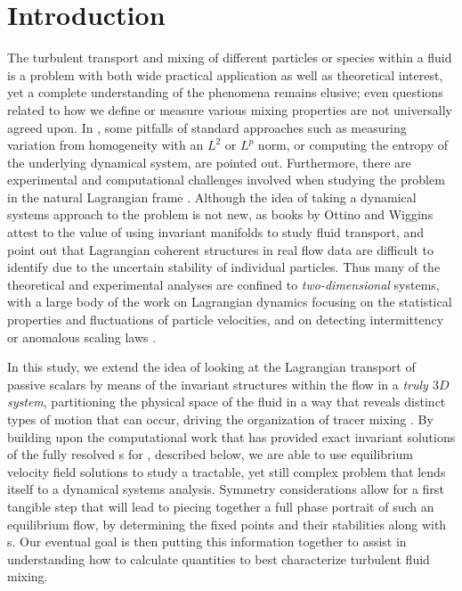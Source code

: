 

\section{Introduction}
\label{sec:intro}

The turbulent transport and mixing of different particles or species 
within a fluid is a problem with both wide practical application as well 
as theoretical interest, yet a complete understanding of the phenomena 
remains elusive; even questions related to how we define or measure 
various mixing properties are not universally agreed upon. In 
\cite{MaMPe05}, some pitfalls of standard approaches such as measuring 
variation from homogeneity with an $L^2$ or $L^p$ norm, or computing the 
entropy of the underlying dynamical system, are pointed out. Furthermore, 
there are experimental and computational challenges involved when 
studying the problem in the natural Lagrangian frame 
\cite{MHPRS07,ABBBBB08,BrLiEc06,MoLePi04}. Although the idea of taking a 
dynamical systems approach to the problem is not new, as books by Ottino 
\cite{Botti89} and Wiggins \cite{Wiggins1992} attest to the value of
using invariant manifolds to study fluid transport, \cite{MHPRS07} and 
\cite{Haller02} point out that Lagrangian coherent structures in 
real flow data are difficult to identify due to the uncertain stability 
of individual particles. Thus many of the theoretical and experimental 
analyses are confined to \textit{two-dimensional} systems, with a large 
body of the work on Lagrangian dynamics focusing on the statistical 
properties and fluctuations of particle velocities, and on detecting 
intermittency or anomalous scaling laws 
\cite{EgeChi22,MoLePi04,ABBBBB08,FaGaVe01}. 

In this study, we extend the idea of looking at the Lagrangian transport 
of passive scalars by means of the invariant structures within the flow 
in a \textit{truly $3D$ system}, partitioning the physical space of the 
fluid in a way that reveals distinct types of motion that can occur, 
driving the organization of tracer mixing \cite{Haller02}. By building 
upon the computational work that has provided exact invariant solutions 
of the fully resolved {\NSe}s for {\pCf}, 
described below, we are able to use equilibrium velocity field solutions 
to study a tractable, yet still complex problem that lends itself to a 
dynamical systems analysis. Symmetry considerations allow for a first 
tangible step that will lead to piecing together a full phase portrait of 
such an equilibrium flow, by determining the fixed points and their 
stabilities along with {\hc}s.  Our eventual goal is 
then putting this information together to assist in understanding how to 
calculate quantities to best characterize turbulent fluid mixing. 

